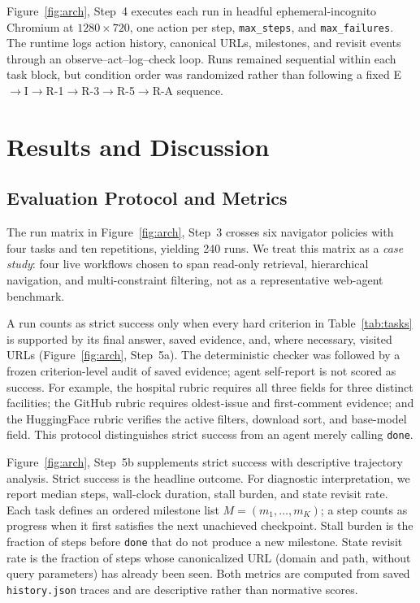 \documentclass{llncs}
\DeclareRobustCommand{\code}[1]{\allowbreak\nolinkurl{#1}\allowbreak}
\begin{document}
Figure~\ref{fig:arch}, Step~4 executes each run in headful ephemeral-incognito
Chromium at $1280\times720$, one action per step, \code{max\_steps}=35, and
\code{max\_failures}=3. The runtime logs action history, canonical URLs,
milestones, and revisit events through an observe--act--log--check loop.
Runs remained sequential within each task block, but condition order was
randomized rather than following a fixed
E$\rightarrow$I$\rightarrow$R-1$\rightarrow$R-3$\rightarrow$R-5$\rightarrow$R-A
sequence.

\section{Results and Discussion}
\label{sec:results-discussion}

\subsection{Evaluation Protocol and Metrics}
\label{sec:evaluation-protocol}

The run matrix in Figure~\ref{fig:arch}, Step~3 crosses six navigator policies
with four tasks and ten repetitions, yielding 240 runs. We treat this matrix as a
\emph{case study}: four live workflows chosen to span read-only retrieval,
hierarchical navigation, and multi-constraint filtering, not as a representative
web-agent benchmark.

A run counts as strict success only when every hard criterion in
Table~\ref{tab:tasks} is supported by its final answer, saved evidence, and,
where necessary, visited URLs (Figure~\ref{fig:arch}, Step~5a). The
deterministic checker was followed by a frozen criterion-level audit of saved
evidence; agent self-report is not scored as success. For example, the hospital
rubric requires all three fields for three distinct facilities; the GitHub rubric
requires oldest-issue and first-comment evidence; and the HuggingFace rubric
verifies the active filters, download sort, and base-model field. This protocol
distinguishes strict success from an agent merely calling \mbox{\texttt{done}}.

Figure~\ref{fig:arch}, Step~5b supplements strict success with descriptive
trajectory analysis. Strict success is the headline outcome. For diagnostic
interpretation, we report median steps, wall-clock duration, stall burden, and
state revisit rate. Each task defines an ordered milestone list
$M=(m_1,\ldots,m_K)$; a step counts as progress when it first satisfies the
next unachieved checkpoint. Stall burden is the fraction of steps before
\code{done} that do not produce a new milestone. State revisit rate is the
fraction of steps whose canonicalized URL (domain and path, without query
parameters) has already been seen. Both metrics are computed from saved
\code{history.json} traces and are descriptive rather than normative scores.
\end{document}
